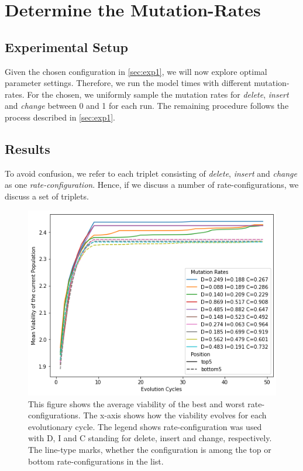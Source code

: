 \documentclass[./../../paper.tex]{subfiles}
\begin{document}
\section{Determine the Mutation-Rates}

\subsection{Experimental Setup}
\label{sec:exp2}
Given the chosen configuration in \autoref{sec:exp1}, we will now explore optimal parameter settings. Therefore, we run the model  times with different mutation-rates. For the chosen, we uniformly sample the mutation rates for \emph{delete}, \emph{insert} and \emph{change} between 0 and 1 for each run. The remaining procedure follows the process described in \autoref{sec:exp1}.


\subsection{Results}
To avoid confusion, we refer to each triplet consisting of \emph{delete}, \emph{insert} and \emph{change} as one \emph{rate-configuration}. Hence, if we discuss a number of rate-configurations, we discuss a set of triplets.  

\begin{figure}[htbp]
    \centering
    \includegraphics[width=\textwidth]{figures/generated/exp2_effect_on_viability_top10_last10.png}
    \caption{This figure shows the average viability of the  best and worst rate-configurations. The x-axis shows how the viability evolves for each evolutionary cycle. The legend shows rate-configuration was used with D, I and C standing for delete, insert and change, respectively. The line-type marks, whether the configuration is among the top or bottom rate-configurations in the list.}
    \label{fig:average-mutation-rates}
\end{figure}
\end{document}
